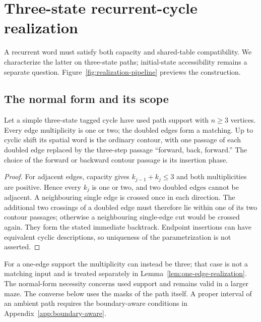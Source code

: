 \section{Three-state recurrent-cycle realization}\label{sec:realization}

A recurrent word must satisfy both capacity and shared-table compatibility.
We characterize the latter on three-state paths; initial-state accessibility remains
a separate question. Figure~\ref{fig:realization-pipeline} previews the construction.

\subsection{The normal form and its scope}

\begin{proposition}\label{prop:three-normal-form}
Let a simple three-state tagged cycle have used path support with $n\ge3$ vertices.
Every edge multiplicity is one or two; the doubled edges form a matching.
Up to cyclic shift its spatial word is the ordinary contour, with one passage of
each doubled edge replaced by the three-step passage ``forward, back, forward.''
The choice of the forward or backward contour passage is its insertion phase.
\end{proposition}
\begin{proof}
For adjacent edges, capacity gives $k_{j-1}+k_j\le3$ and both multiplicities are
positive. Hence every $k_j$ is one or two, and two doubled edges cannot be adjacent.
A neighbouring single edge is crossed once in each direction. The additional two
crossings of a doubled edge must therefore lie within one of its two contour
passages; otherwise a neighbouring single-edge cut would be crossed again.
They form the stated immediate backtrack. Endpoint insertions can have equivalent
cyclic descriptions, so uniqueness of the parametrization is not asserted.
\end{proof}

For a one-edge support the multiplicity can instead be three; that case is not a
matching input and is treated separately in Lemma~\ref{lem:one-edge-realization}.
The normal-form necessity concerns used support and remains valid in a larger maze.
The converse below uses the masks of the path itself. A proper interval of an ambient
path requires the boundary-aware conditions in Appendix~\ref{app:boundary-aware}.


